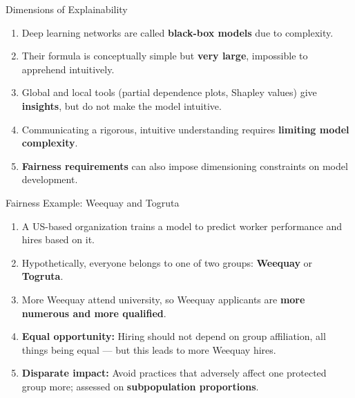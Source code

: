 \begin{frame}{Dimensions of Explainability}
\begin{enumerate}
\item<1-> Deep learning networks are called \textbf{black-box models} due to complexity.
\item<2-> Their formula is conceptually simple but \textbf{very large}, impossible to apprehend intuitively.
\item<3-> Global and local tools (partial dependence plots, Shapley values) give \textbf{insights}, but do not make the model intuitive.
\item<4-> Communicating a rigorous, intuitive understanding requires \textbf{limiting model complexity}.
\item<5-> \textbf{Fairness requirements} can also impose dimensioning constraints on model development.
\end{enumerate}
\end{frame}

\begin{frame}{Fairness Example: Weequay and Togruta}
\begin{enumerate}
\item<1-> A US-based organization trains a model to predict worker performance and hires based on it.
\item<2-> Hypothetically, everyone belongs to one of two groups: \textbf{Weequay} or \textbf{Togruta}.
\item<3-> More Weequay attend university, so Weequay applicants are \textbf{more numerous and more qualified}.
\item<4-> \textbf{Equal opportunity:} Hiring should not depend on group affiliation, all things being equal --- but this leads to more Weequay hires.
\item<5-> \textbf{Disparate impact:} Avoid practices that adversely affect one protected group more; assessed on \textbf{subpopulation proportions}.
\end{enumerate}
\end{frame}

